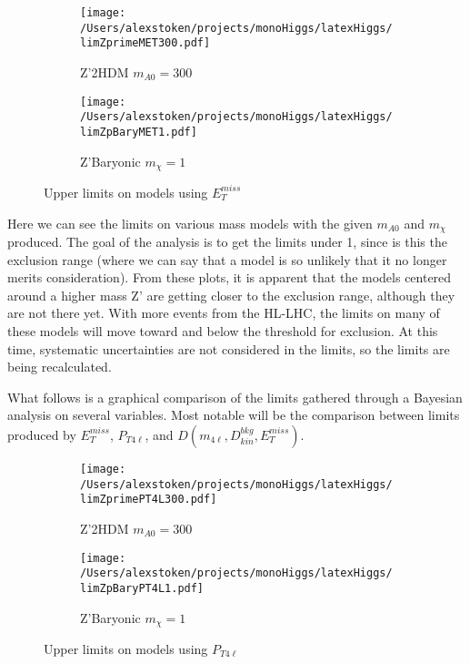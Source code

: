 \documentclass[11pt, english]{article}
\begin{document}
\begin{figure}[H]
	\begin{subfigure}{.5\textwidth}
		\centering
		\texttt{[image: /Users/alexstoken/projects/monoHiggs/latexHiggs/limZprimeMET300.pdf]}
		\centering
		\caption{Z'2HDM $m_{A0} = 300$}
		\label{fig: limZprime300met}
	\end{subfigure}%
	\begin{subfigure}{.5\textwidth}
		\centering
		\texttt{[image: /Users/alexstoken/projects/monoHiggs/latexHiggs/limZpBaryMET1.pdf]}
		\caption{Z'Baryonic $m_{\chi} = 1$}
		\label{fig: limZpBary1met}
	\end{subfigure}
\caption{Upper limits on models using $E_{T}^{miss}$}
\label{fig: limitsPlots}
\end{figure}

Here we can see the limits on various mass models with the given $m_{A0}$ and $m_{\chi}$ produced. The goal of the analysis is to get the limits under 1, since is this the exclusion range (where we can say that a model is so unlikely that it no longer merits consideration). From these plots, it is apparent that the models centered around a higher mass Z' are getting closer to the exclusion range, although they are not there yet. With more events from the HL-LHC, the limits on many of these models will move toward and below the threshold for exclusion. At this time, systematic uncertainties are not considered in the limits, so the limits are being recalculated.

What follows is a graphical comparison of the limits gathered through a Bayesian analysis on several variables. Most notable will be the comparison between limits produced by $E_{T}^{miss}$, $P_{T4\ell}$, and $D(m_{4\ell}, D_{kin}^{bkg}, E_{T}^{miss})$. 

\begin{figure}[h!]
	\begin{subfigure}{.5\textwidth}
		\centering
		\texttt{[image: /Users/alexstoken/projects/monoHiggs/latexHiggs/limZprimePT4L300.pdf]}
		\centering
		\caption{Z'2HDM $m_{A0} = 300$}
		\label{fig: limZprime300pt4l}
	\end{subfigure}%
	\begin{subfigure}{.5\textwidth}
		\centering
		\texttt{[image: /Users/alexstoken/projects/monoHiggs/latexHiggs/limZpBaryPT4L1.pdf]}
		\caption{Z'Baryonic $m_{\chi} = 1$}
		\label{fig: limZpBary1pt4l}
	\end{subfigure}
\caption{Upper limits on models using $P_{T4\ell}$}
\label{fig: limitsPlotsPT4l}
\end{figure}
\end{document}
